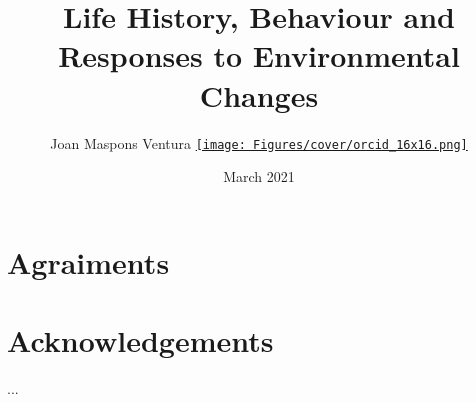\documentclass[12pt,a4paper,twoside,fleqn]{memoir}
\title{Life History, Behaviour and Responses to Environmental Changes} %
\author{Joan Maspons Ventura %
  \href{https://orcid.org/0000-0003-2286-8727}{\texttt{[image: Figures/cover/orcid\_16x16.png]}}
}
\date{March 2021} %
\begin{document}
\begin{titlingpage}
\maketitle %
\end{titlingpage}

\frontmatter %


\section*{Agraiments}


\section*{Acknowledgements}
...
% 
% 
% 
% 
\end{document}
